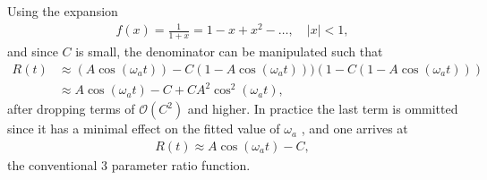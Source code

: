 Using the expansion 
	\begin{align}
		f(x) = \frac{1}{1+x} = 1 - x + x^2 - \dots, \quad |x| < 1,
	\end{align}
and since $C$ is small, the denominator can be manipulated such that
	\begin{equation}
	\begin{aligned}
		R(t) &\approx (A \cos(\omega_{a}t)) - C (1 - A \cos(\omega_{a}t)))(1 - C (1 - A \cos(\omega_{a}t))) \\
		     &\approx A \cos(\omega_{a}t) - C + C A^{2} \cos^2(\omega_{a}t),
	\end{aligned}
	\end{equation}
after dropping terms of $\mathcal{O}(C^{2})$ and higher. In practice the last term is ommitted since it has a minimal effect on the fitted value of $\omega_{a}$ \cite{cite}, and one arrives at
	\begin{align}
		R(t) \approx A \cos(\omega_{a}t) - C,
	\end{align}
the conventional 3 parameter ratio function.



